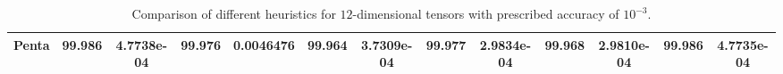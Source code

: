 \documentclass[runningheads]{llncs}
\begin{document}
\begin{table}[!htb]
{\begin{tabular}{|c|c|c|c|c|c|c|c|c|c|c|c|c|}
			Penta & 99.986 & 4.7738e-04
			& 99.976 & 0.0046476 & 99.964 & 3.7309e-04 
			& 99.977 & 2.9834e-04 & 99.968 & 2.9810e-04
			& 99.986 & 4.7735e-04\\ \hline
		\end{tabular}
	}
	\caption{Comparison of different heuristics for $12$-dimensional tensors with  prescribed accuracy of $10^{-3}$.\label{tab:12-dim-10-3}}
\end{table}
\end{document}
